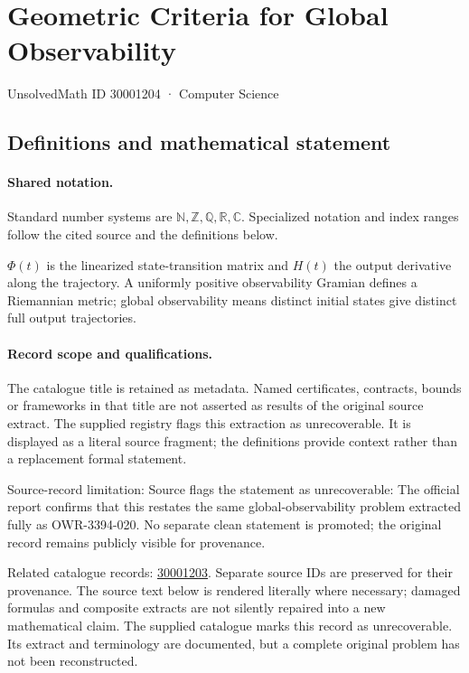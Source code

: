 \documentclass[11pt]{article}
\begin{document}
\setcounter{section}{30001203}
\section{Geometric Criteria for Global Observability}\label{30001204}
{\small\sffamily UnsolvedMath ID 30001204 · Computer Science}
\subsection{Definitions and mathematical statement}

\paragraph{Shared notation.}Standard number systems are $\mathbb N,\mathbb Z,\mathbb Q,\mathbb R,\mathbb C$. Specialized notation and index ranges follow the cited source and the definitions below.


$\Phi(t)$ is the linearized state-transition matrix and $H(t)$ the output derivative along the trajectory. A uniformly positive observability Gramian defines a Riemannian metric; global observability means distinct initial states give distinct full output trajectories.
\paragraph{Record scope and qualifications.}
The catalogue title is retained as metadata. Named certificates, contracts, bounds or frameworks in that title are not asserted as results of the original source extract.
The supplied registry flags this extraction as unrecoverable. It is displayed as a literal source fragment; the definitions provide context rather than a replacement formal statement.

Source-record limitation: Source flags the statement as unrecoverable: The official report confirms that this restates the same global-observability problem extracted fully as OWR-3394-020. No separate clean statement is promoted; the original record remains publicly visible for provenance.

Related catalogue records: \href{https://mehmetmars7.github.io/Erdosproblems-llm-hunter/problem.html?type=open_problems&id=30001203}{30001203}. Separate source IDs are preserved for their provenance.
The source text below is rendered literally where necessary; damaged formulas and composite extracts are not silently repaired into a new mathematical claim.
The supplied catalogue marks this record as unrecoverable. Its extract and terminology are documented, but a complete original problem has not been reconstructed.
\end{document}
